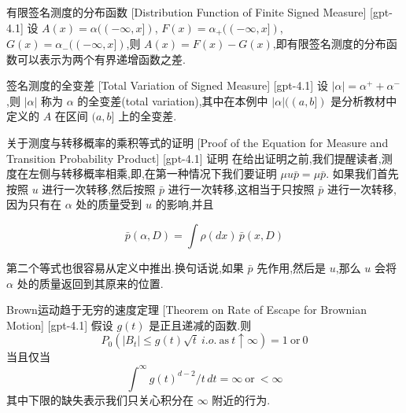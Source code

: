 \documentclass[UTF8]{ctexart}
\begin{document}
    
    
    \begin{dfn}
        {有限签名测度的分布函数}
        [Distribution Function of Finite Signed Measure]
        [gpt-4.1]
        设 $A(x) = \alpha((-\infty, x])$, $F(x) = \alpha_{+}((-\infty, x])$, $G(x) = \alpha_{-}((-\infty, x])$,则 $A(x) = F(x) - G(x)$,即有限签名测度的分布函数可以表示为两个有界递增函数之差.
    \end{dfn}
    
    
    
    \begin{dfn}
        {签名测度的全变差}
        [Total Variation of Signed Measure]
        [gpt-4.1]
        设 $|\alpha| = \alpha^{+} + \alpha^{-}$,则 $|\alpha|$ 称为 $\alpha$ 的全变差(total variation),其中在本例中 $|\alpha|((a, b])$ 是分析教材中定义的 $A$ 在区间 $(a, b]$ 上的全变差.
    \end{dfn}
    
    
    
    \begin{prf}
        {关于测度与转移概率的乘积等式的证明}
        [Proof of the Equation for Measure and Transition Probability Product]
        [gpt-4.1]
        证明 在给出证明之前,我们提醒读者,测度在左侧与转移概率相乘,即,在第一种情况下我们要证明 $\mu 
u \bar{p} = \mu \bar{p}$.
如果我们首先按照 $
u$ 进行一次转移,然后按照 $\bar{p}$ 进行一次转移,这相当于只按照 $\bar{p}$ 进行一次转移,因为只有在 $\alpha$ 处的质量受到 $
u$ 的影响,并且

\[
\bar{p}(\alpha, D) = \int \rho(dx)\, \bar{p}(x, D)
\]

第二个等式也很容易从定义中推出.换句话说,如果 $\bar{p}$ 先作用,然后是 $
u$,那么 $
u$ 会将 $\alpha$ 处的质量返回到其原来的位置.

    \end{prf}
    
    
    
    \begin{thm}
        {Brown运动趋于无穷的速度定理}
        [Theorem on Rate of Escape for Brownian Motion]
        [gpt-4.1]
        假设 $g(t)$ 是正且递减的函数.则
\[
P_{0}(|B_{t}| \le g(t) \sqrt{t}~i.o.~\text{as}~t \uparrow \infty) = 1~\text{or}~0
\]
当且仅当
\[
\int^{\infty} g(t)^{d-2} / t\, dt = \infty~\text{or}~< \infty
\]
其中下限的缺失表示我们只关心积分在 $\infty$ 附近的行为.
    \end{thm}
    
\end{document}
